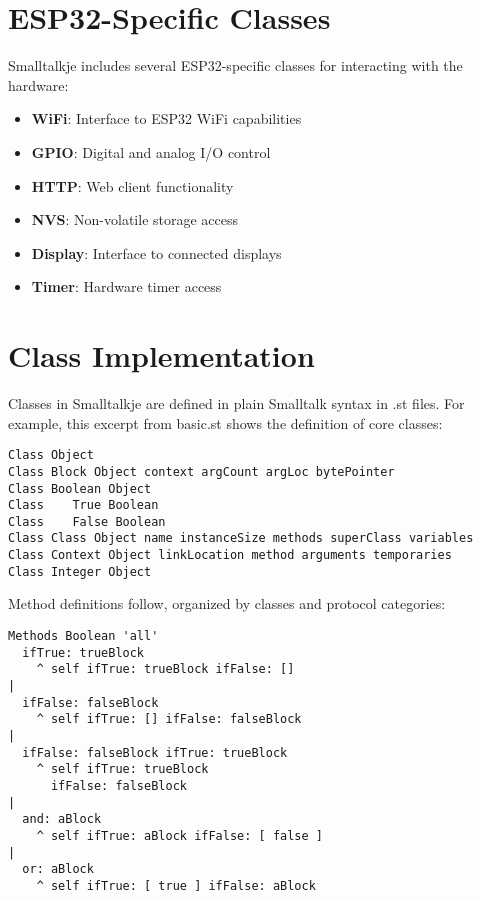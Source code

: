 \documentclass[12pt,a4paper]{report}
\begin{document}
\section{ESP32-Specific Classes}

Smalltalkje includes several ESP32-specific classes for interacting with the hardware:

\begin{itemize}
    \item \textbf{WiFi}: Interface to ESP32 WiFi capabilities
    \item \textbf{GPIO}: Digital and analog I/O control
    \item \textbf{HTTP}: Web client functionality
    \item \textbf{NVS}: Non-volatile storage access
    \item \textbf{Display}: Interface to connected displays
    \item \textbf{Timer}: Hardware timer access
\end{itemize}

\section{Class Implementation}

Classes in Smalltalkje are defined in plain Smalltalk syntax in .st files. For example, this excerpt from basic.st shows the definition of core classes:

\begin{lstlisting}[style=smalltalk]
Class Object
Class Block Object context argCount argLoc bytePointer
Class Boolean Object
Class    True Boolean
Class    False Boolean
Class Class Object name instanceSize methods superClass variables
Class Context Object linkLocation method arguments temporaries
Class Integer Object
\end{lstlisting}

Method definitions follow, organized by classes and protocol categories:

\begin{lstlisting}[style=smalltalk]
Methods Boolean 'all'
  ifTrue: trueBlock
    ^ self ifTrue: trueBlock ifFalse: []
|
  ifFalse: falseBlock
    ^ self ifTrue: [] ifFalse: falseBlock
|
  ifFalse: falseBlock ifTrue: trueBlock
    ^ self ifTrue: trueBlock
      ifFalse: falseBlock
|
  and: aBlock
    ^ self ifTrue: aBlock ifFalse: [ false ]
|
  or: aBlock
    ^ self ifTrue: [ true ] ifFalse: aBlock
\end{lstlisting}
\end{document}
